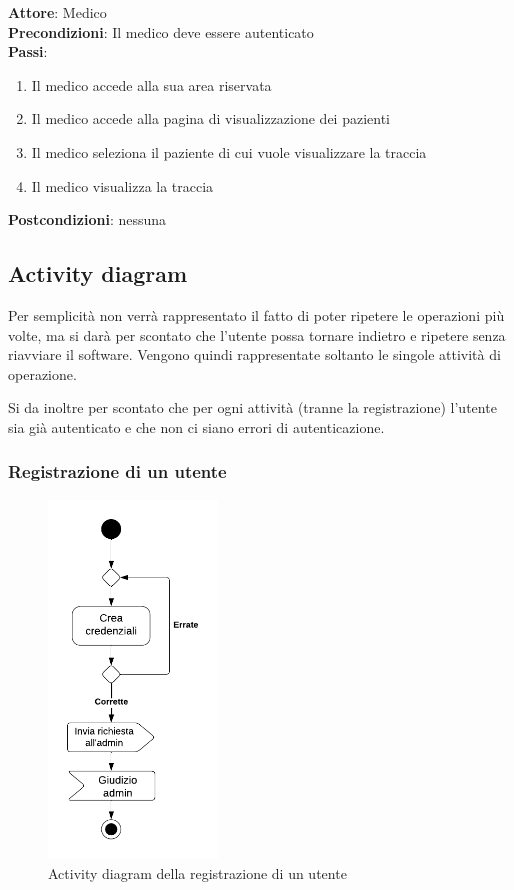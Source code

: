 \documentclass[a4paper]{article}
\begin{document}
\begin{mdframed}
  \textbf{Attore}: Medico\\
  \textbf{Precondizioni}: Il medico deve essere autenticato\\
  \textbf{Passi}: 
  \begin{enumerate}[nosep]
    \item Il medico accede alla sua area riservata
    \item Il medico accede alla pagina di visualizzazione dei pazienti
    \item Il medico seleziona il paziente di cui vuole visualizzare la traccia
    \item Il medico visualizza la traccia
  \end{enumerate}
  \textbf{Postcondizioni}: nessuna
\end{mdframed}


\subsection{Activity diagram}

Per semplicità non verrà rappresentato il fatto di poter ripetere le operazioni più volte,
ma si darà per scontato che l'utente possa tornare indietro e ripetere senza riavviare
il software. Vengono quindi rappresentate soltanto le singole attività di operazione.

Si da inoltre per scontato che per ogni attività (tranne la registrazione) l'utente sia
già autenticato e che non ci siano errori di autenticazione.

\subsubsection{Registrazione di un utente}

\begin{figure}[H]
  \begin{center}
    \includegraphics[width=0.4\textwidth]{adRegistrazione}
  \end{center}
  \caption{Activity diagram della registrazione di un utente}
  \label{fig:adRegistrazione}
\end{figure}
\end{document}

